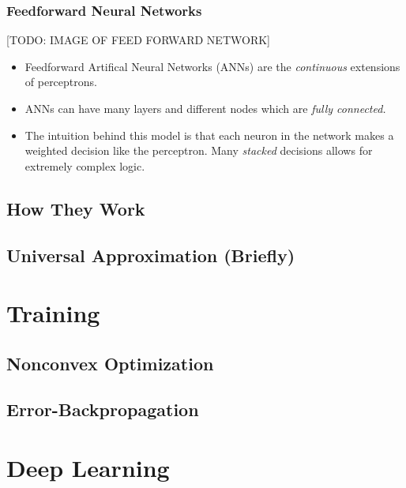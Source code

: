\documentclass{beamer}
\begin{document}
    \begin{frame}
        \frametitle{Feedforward Neural Networks}
        [TODO: IMAGE OF FEED FORWARD NETWORK]
        \begin{itemize}
        \item Feedforward Artifical Neural Networks (ANNs) are the \emph{continuous}
        extensions of perceptrons.
        \item ANNs can have many layers and different nodes
         which are \emph{fully connected.}
       
         \item The intuition behind this model is that each neuron in the network
         makes a weighted decision like the perceptron. Many \emph{stacked} decisions
         allows for extremely complex logic.
        \end{itemize}
    \end{frame}

    \subsection{How They Work} %



    \subsection{Universal Approximation (Briefly)}

\section{Training}

    \subsection{Nonconvex Optimization}
    \subsection{Error-Backpropagation}

\section{Deep Learning}


\end{document}
